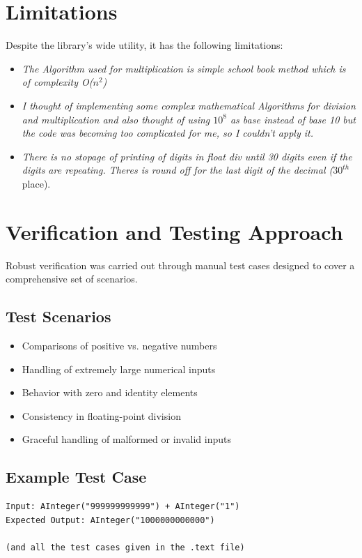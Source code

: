 \documentclass[12pt]{article}
\begin{document}
\section{Limitations}
\label{sec:limitations}
Despite the library’s wide utility, it has the following limitations:

\begin{itemize}[noitemsep]
    \item \textit{The Algorithm used for multiplication is simple school book method which is of complexity O(\( n^2 \))}
    \item \textit{I thought of implementing some complex mathematical Algorithms for division and multiplication and also thought of using \( 10^8\) as base instead of base 10 but the code was becoming too complicated for me, so I couldn't apply it.}
    \item \textit{There is no stopage of printing of digits in float div until 30 digits even if the digits are repeating. Theres is round off for the last digit of the decimal (\(30^{th}\)} place).
\end{itemize}

\section{Verification and Testing Approach}
\label{sec:verification}
Robust verification was carried out through manual test cases designed to cover a comprehensive set of scenarios.

\subsection*{Test Scenarios}
\begin{itemize}[noitemsep]
    \item Comparisons of positive vs. negative numbers
    \item Handling of extremely large numerical inputs
    \item Behavior with zero and identity elements
    \item Consistency in floating-point division
    \item Graceful handling of malformed or invalid inputs
\end{itemize}

\subsection*{Example Test Case}
\begin{verbatim}
Input: AInteger("999999999999") + AInteger("1")
Expected Output: AInteger("1000000000000")

(and all the test cases given in the .text file)
\end{verbatim}
\end{document}
